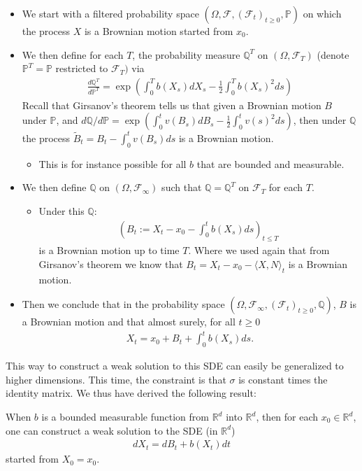 \documentclass[../mainfile.tex]{subfiles}
\begin{document}
\begin{itemize}
\item We start with a filtered probability space $( \Omega, \mathcal{F}, (\mathcal{F}_t)_{t \geq 0 }, \mathbb{P})$ on which the process $X$ is a Brownian motion started from $x_0$. 
\item We then define for each $T$, the probability measure $\mathbb{Q}^T$ on $( \Omega, \mathcal{F}_T)$ (denote $\mathbb{P}^T = \mathbb{P}$ restricted to $\mathcal{F}_T)$ via
\begin{align*}
\frac{d \mathbb{Q}^T}{d \mathbb{P}^T}= \exp \left( \int_0^T b(X_s) d X_s - \frac{1}{2} \int_0^T b(X_s)^2 ds \right)
\end{align*}
Recall that Girsanov's theorem tells us that given a Brownian motion $B$ under $\mathbb{P}$, and $ d\mathbb{Q}/  d \mathbb{P}= \exp ( \int_0^t v(B_s)dB_s - \frac{1}{2} \int_0^t v(s)^2 ds)$, then under $\mathbb{Q}$ the process $\tilde{B}_t = B_t- \int_0^t v(B_s)ds$ is a Brownian motion. 
\newpage
\begin{itemize}
\item This is for instance possible for all $b$ that are bounded and measurable. 
\end{itemize}
\item We then define $\mathbb{Q}$ on $(\Omega, \mathcal{F}_\infty)$ such that $\mathbb{Q}= \mathbb{Q}^T$ on $\mathcal{F}_T$ for each $T$.
\begin{itemize}
\item Under this $\mathbb{Q}:$ 
\begin{align*}
\left( B_t:= X_t-x_0- \int_0^t b(X_s)ds \right)_{t \leq T}
\end{align*}
is a Brownian motion up to time $T$. Where we used again that from Girsanov's theorem we know that $B_t= X_t-x_0 - \langle X, N \rangle_t $ is a Brownian motion. 
\end{itemize}
\item Then we conclude that in the probability space $( \Omega, \mathcal{F}_\infty, ( \mathcal{F}_t)_{t \geq 0 }, \mathbb{Q})$, $B$ is a Brownian motion and that almost surely, for all $t \geq 0$
\begin{align*}
X_t = x_0 + B_t + \int_0^t b(X_s)ds.
\end{align*}
\end{itemize}
This way to construct a weak solution to this SDE can easily be generalized to higher dimensions. This time, the constraint is that $\sigma$ is constant times the identity matrix. We thus have derived the following result:
\begin{prop} When $b$ is a bounded measurable function from $\mathbb{R}^d$ into $\mathbb{R}^d$, then for each $x_0 \in \mathbb{R}^d$, one can construct a weak solution to the SDE (in $\mathbb{R}^d$)
\begin{align*}
dX_t = dB_t + b(X_t)dt
\end{align*}
started from $X_0=x_0$.
\end{prop}
\end{document}
